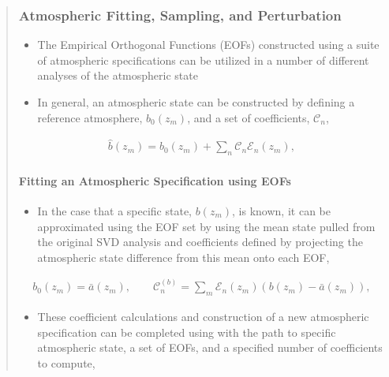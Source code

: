 \documentclass[letterpaper,10pt,english]{sphinxmanual}
\begin{document}
\begin{itemize}
\begin{quote}
\begin{itemize}
\end{itemize}


\subsubsection{Atmospheric Fitting, Sampling, and Perturbation}
\label{\detokenize{sampling:atmospheric-fitting-sampling-and-perturbation}}\label{\detokenize{sampling:sampling}}\label{\detokenize{sampling::doc}}\begin{itemize}
\item {} 
\sphinxAtStartPar
The Empirical Orthogonal Functions (EOFs) constructed using a suite of atmospheric specifications can be utilized in a number of different analyses of the atmospheric state

\item {} 
\sphinxAtStartPar
In general, an atmospheric state can be constructed by defining a reference atmosphere, \(b_0 \left( z_m \right)\), and a set of coefficients, \(\mathcal{C}_n\),

\end{itemize}
\begin{equation*}
\begin{split}\hat{b} \left( z_m \right) = b_0 \left( z_m \right) + \sum_n{ \mathcal{C}_n \mathcal{E}_n \left( z_m \right)},\end{split}
\end{equation*}

\paragraph{Fitting an Atmospheric Specification using EOFs}
\label{\detokenize{sampling:fitting-an-atmospheric-specification-using-eofs}}\begin{itemize}
\item {} 
\sphinxAtStartPar
In the case that a specific state, \(b \left(z_m \right)\), is known, it can be approximated using the EOF set by using the mean state pulled from the original SVD analysis and coefficients defined by projecting the atmospheric state difference from this mean onto each EOF,

\end{itemize}
\begin{equation*}
\begin{split}b_0 \left( z_m \right) = \bar{a}  \left( z_m \right) , \quad \quad \mathcal{C}_n^{(b)} = \sum_m{\mathcal{E}_n \left( z_m \right) \left( b \left( z_m \right) - \bar{a} \left( z_m \right) \right)},\end{split}
\end{equation*}\begin{itemize}
\item {} 
\sphinxAtStartPar
These coefficient calculations and construction of a new atmospheric specification can be completed using  with the path to specific atmospheric state, a set of EOFs, and a specified number of coefficients to compute,


\end{itemize}
\end{quote}
\end{itemize}
\end{document}
